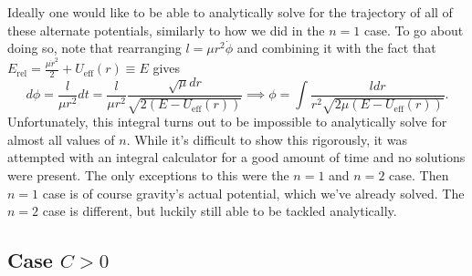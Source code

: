 \documentclass[letterpaper, reqno,11pt]{article}
\begin{document}
Ideally one would like to be able to analytically solve for the trajectory of all of these alternate potentials, similarly to how we did in the $n=1$ case. To go about doing so, note that rearranging $l=\mu r^2\dot\phi$ and combining it with the fact that $E_{\text{rel}}=\frac{\mu \dot r^2}{2} +U_{\text{eff}}(r)\equiv E$ gives 
\begin{equation}\label{eq:traj}
d\phi=\frac{l}{\mu r^2}dt=\frac{l}{\mu r^2}\frac{\sqrt{\mu}dr }{\sqrt{ 2(E-U_\text{eff}(r))}}\implies\phi=\int \frac{ldr}{r^2\sqrt{2\mu\left( E-U_{\text{eff}}(r) \right) } }
.\end{equation}
Unfortunately, this integral turns out to be impossible to analytically solve for almost all values of $n$. While it's difficult to show this rigorously, it was attempted with an integral calculator for a good amount of time and no solutions were present. The only exceptions to this were the $n=1$ and $n=2$ case. Then $n=1$ case is of course gravity's actual potential, which we've already solved. The $n=2$ case is different, but luckily still able to be tackled analytically. 

\subsection{Case $C>0$}
\end{document}
